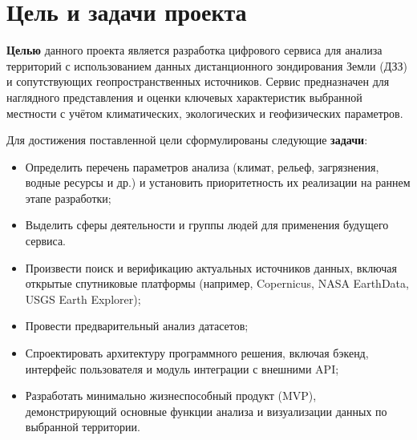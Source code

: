 \section{Цель и задачи проекта}

\textbf{Целью} данного проекта является разработка цифрового сервиса для анализа территорий с использованием данных дистанционного зондирования Земли (ДЗЗ) и сопутствующих геопространственных источников. Сервис предназначен для наглядного представления и оценки ключевых характеристик выбранной местности с учётом климатических, экологических и геофизических параметров.

Для достижения поставленной цели сформулированы следующие \textbf{задачи}:

\begin{itemize}
	\item Определить перечень параметров анализа (климат, рельеф, загрязнения, водные ресурсы и др.) и установить приоритетность их реализации на раннем этапе разработки;
	\item Выделить сферы деятельности и группы людей для применения будущего сервиса.
	\item Произвести поиск и верификацию актуальных источников данных, включая открытые спутниковые платформы (например, Copernicus, NASA EarthData, USGS Earth Explorer);
	\item Провести предварительный анализ датасетов;
	\item Спроектировать архитектуру программного решения, включая бэкенд, интерфейс пользователя и модуль интеграции с внешними API;
	\item Разработать минимально жизнеспособный продукт (MVP), демонстрирующий основные функции анализа и визуализации данных по выбранной территории.
\end{itemize}
